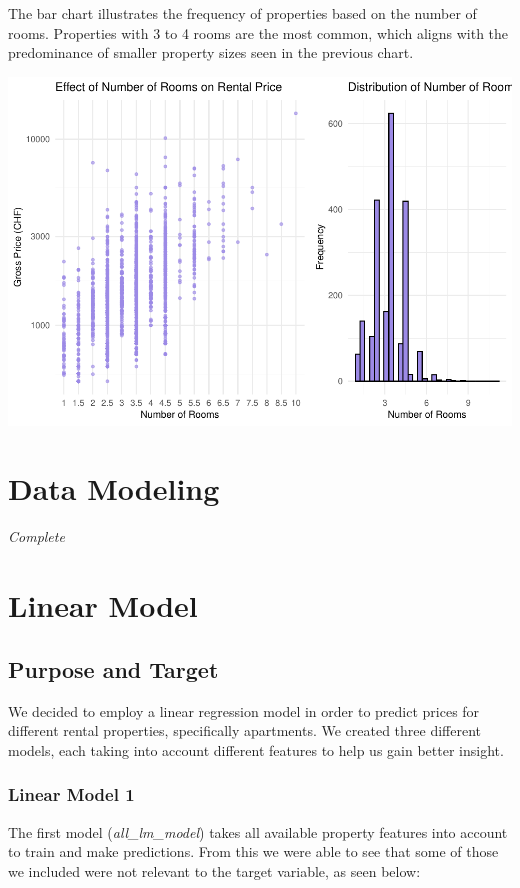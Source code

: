 \documentclass[
]{article}
\begin{document}
The bar chart illustrates the frequency of properties based on the
number of rooms. Properties with 3 to 4 rooms are the most common, which
aligns with the predominance of smaller property sizes seen in the
previous chart.

\includegraphics{2024_groupXX_report_files/figure-latex/Number of Rooms-1.pdf}

\section{Data Modeling}\label{data-modeling}

\emph{Complete}

\section{Linear Model}\label{linear-model}

\subsection{Purpose and Target}\label{purpose-and-target}

We decided to employ a linear regression model in order to predict
prices for different rental properties, specifically apartments. We
created three different models, each taking into account different
features to help us gain better insight.

\subsubsection{Linear Model 1}\label{linear-model-1}

The first model (\emph{all\_lm\_model}) takes all available property
features into account to train and make predictions. From this we were
able to see that some of those we included were not relevant to the
target variable, as seen below:
\end{document}
